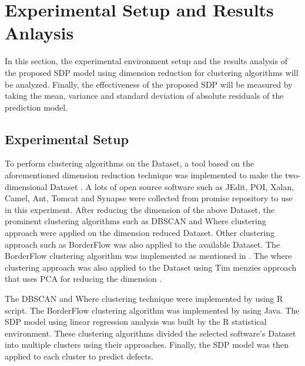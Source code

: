 \documentclass[12pt]{report}
\begin{document}
\section{Experimental Setup and Results Anlaysis}

In this section, the experimental environment setup and the results analysis of the proposed SDP model using dimension reduction for clustering algorithms will be analyzed. Finally, the effectiveness of the proposed SDP will be measured by taking the mean, variance and standard deviation of absolute residuals of the prediction model. 

\subsection{Experimental Setup}

To perform clustering algorithms on the Dataset, a tool based on the aforementioned dimension reduction technique was implemented to make the two-dimensional Dataset . A lots of open source software such as JEdit, POI, Xalan, Camel, Ant, Tomcat and Synapse were collected from promise repository \cite{promise12} to use in this experiment. After reducing the dimension of the above Dataset, the prominent clustering algorithms such as DBSCAN and  Where clustering approach were applied on the dimension reduced Dataset. Other clustering approach such as BorderFlow was also applied to the available Dataset. The BorderFlow clustering algorithm was implemented as mentioned in \cite{scanniello2013class}. The where clustering approach was also applied to the Dataset using Tim menzies approach that uses PCA for reducing the dimension \cite{menzies2011local,menzies2013local}.
 
The DBSCAN \cite{ester1996density} and Where clustering technique \cite{menzies2011local,menzies2013local} were implemented by using R script. The BorderFlow clustering algorithm was implemented by using Java. The SDP model using linear regression analysis was built by the R statistical environment. These clustering algorithms divided the selected software's Dataset into multiple clusters using their approaches. Finally, the SDP model was then applied to each cluster to predict defects. 

\end{document}

